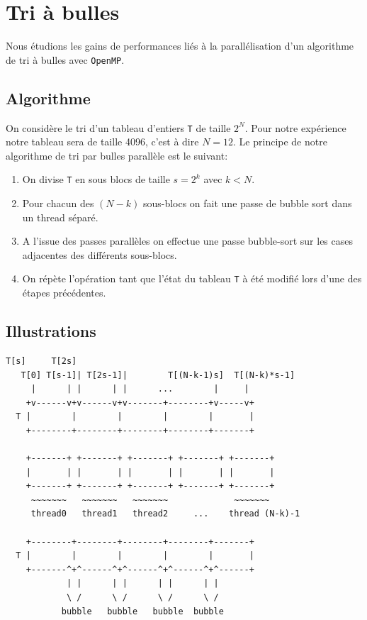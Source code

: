 \documentclass[11pt]{article}
\theoremstyle{definition}
\theoremstyle{definition}
\theoremstyle{definition}
\begin{document}
\section{Tri à bulles}
Nous étudions les gains de performances
liés à la parallélisation d'un algorithme de tri à bulles avec \texttt{OpenMP}.
\subsection{Algorithme}
On considère le tri d'un tableau d'entiers \texttt{T} de taille $2^N$.
Pour notre expérience notre tableau sera de taille 4096, c'est à dire $N = 12$.
Le principe de notre algorithme de tri par bulles parallèle est le suivant:
\begin{enumerate}
\item On divise \texttt{T} en sous blocs de taille $s = 2^k$ avec $k<N$.
\item Pour chacun des $(N-k)$ sous-blocs on fait une passe de bubble sort
  dans un thread séparé.
\item A l'issue des passes parallèles on effectue une passe
  bubble-sort sur les cases adjacentes des différents sous-blocs.
\item On répète l'opération tant que l'état du tableau \texttt{T} à été modifié
 lors d'une des étapes précédentes.
\end{enumerate}

 

 \subsection{Illustrations}
\begin{lstlisting}[basicstyle={\scriptsize\ttfamily}, columns={fixed}, frame={}]
            T[s]     T[2s]
   T[0] T[s-1]| T[2s-1]|        T[(N-k-1)s]  T[(N-k)*s-1]
     |      | |      | |      ...        |     |
    +v------v+v------v+v-------+--------+v-----v+
  T |        |        |        |        |       |
    +--------+--------+--------+--------+-------+
 
    +-------+ +-------+ +-------+ +-------+ +-------+
    |       | |       | |       | |       | |       |
    +-------+ +-------+ +-------+ +-------+ +-------+
     ~~~~~~~   ~~~~~~~   ~~~~~~~             ~~~~~~~
     thread0   thread1   thread2     ...    thread (N-k)-1
 
    +--------+--------+--------+--------+-------+
  T |        |        |        |        |       |
    +-------^+^------^+^------^+^------^+^------+
            | |      | |      | |      | |
            \ /      \ /      \ /      \ /
           bubble   bubble   bubble  bubble
\end{lstlisting}
\end{document}
